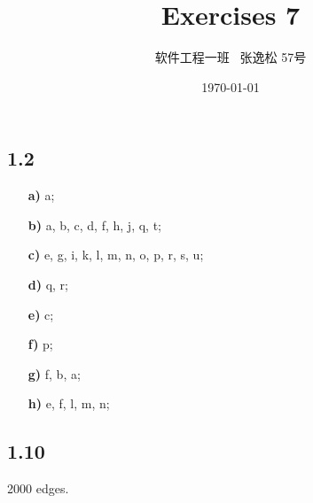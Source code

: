 \documentclass[10pt]{ctexart}
\title{Exercises 7}
\author{软件工程一班 \ 张逸松 57号}
\date{\today}
\begin{document}
    \maketitle
    \subsection*{1.2}
    \begin{itemize}
        \item [\textbf{a)}] a;
        \item [\textbf{b)}] a, b, c, d, f, h, j, q, t;
        \item [\textbf{c)}] e, g, i, k, l, m, n, o, p, r, s, u;
        \item [\textbf{d)}] q, r;
        \item [\textbf{e)}] c;
        \item [\textbf{f)}] p;
        \item [\textbf{g)}] f, b, a;
        \item [\textbf{h)}] e, f, l, m, n;
    \end{itemize}
    \subsection*{1.10}
    2000 edges.
\end{document}
